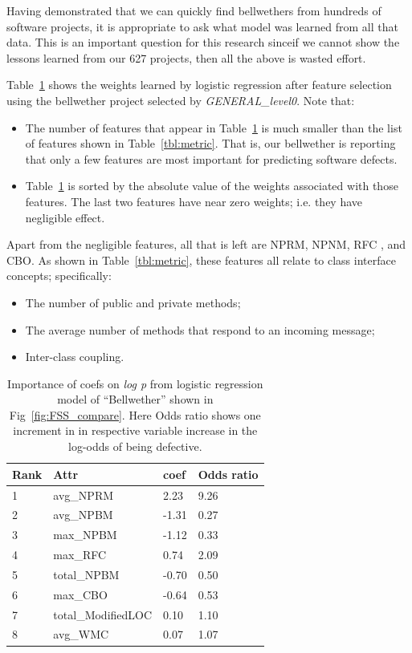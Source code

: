 \documentclass[10pt,journal,compsoc]{IEEEtran}
\newcommand{\bi}{\begin{itemize}}
\newcommand{\ei}{\end{itemize}}
\begin{document}
Having demonstrated that we can quickly find bellwethers
from hundreds of software projects, it is appropriate to ask
what model was learned from all that data. This is an important question for this research sinceif  we cannot show the lessons
learned from our 627 projects, then all the above is wasted effort.

Table~\ref{tbl:coefs}  shows the weights learned by logistic
regression after feature selection using the bellwether project
selected by {\em GENERAL\_level0}. Note that:
\bi
\item
The number of features that appear in Table~\ref{tbl:coefs}  is much smaller than the list of features shown in Table~\ref{tbl:metric}.
That is, our bellwether is reporting that only a few features
are most important for predicting software defects.
\item
Table~\ref{tbl:coefs}  is sorted by the absolute value of the weights
associated with those features. The last two features have near
zero weights; i.e. they have negligible effect.
\ei
Apart from the negligible features, all that is left are NPRM, NPNM, RFC , and CBO. As shown in Table~\ref{tbl:metric}, these features
all relate to class interface concepts; specifically: 
\bi
\item
The number of public and private methods; 
\item
The  average number of methods that respond to an incoming message; 
\item
Inter-class coupling. 
\ei
\begin{table}[!t]
\centering
\begin{tabular}{|l|l|l|l|} \hline
Rank & Attr               & coef  & Odds ratio \\ \hline
1    & avg\_NPRM          & 2.23  & 9.26      \\ \hline
2    & avg\_NPBM          & -1.31 & 0.27      \\ \hline
3    & max\_NPBM          & -1.12 & 0.33      \\ \hline
4    & max\_RFC           & 0.74  & 2.09      \\ \hline 
5    & total\_NPBM        & -0.70 & 0.50      \\ \hline
6    & max\_CBO           & -0.64 & 0.53      \\ \hline
7    & total\_ModifiedLOC & 0.10  & 1.10      \\ \hline
8    & avg\_WMC           & 0.07  & 1.07     \\ \hline
\end{tabular}

\caption{Importance of coefs on \textit{log p} from logistic regression model of ``Bellwether'' shown in Fig~\ref{fig:FSS_compare}. Here Odds ratio shows one increment in in respective variable increase in the log-odds of being defective.}\label{tbl:coefs}
\end{table}
\end{document}
